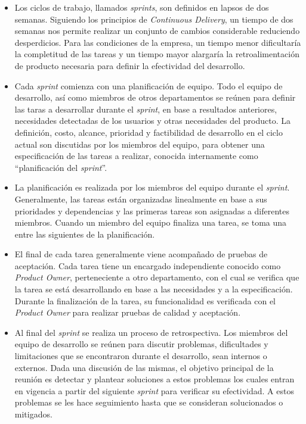 \begin{itemize}

  \item Los ciclos de trabajo, llamados \textit{sprints}, son definidos en lapsos de dos semanas. Siguiendo los principios de \textit{Continuous Delivery}, un tiempo de dos semanas nos permite realizar un conjunto de cambios considerable reduciendo desperdicios. Para las condiciones de la empresa, un tiempo menor dificultaría la completitud de las tareas y un tiempo mayor alargaría la retroalimentación de producto necesaria para definir la efectividad del desarrollo.

  \item Cada \textit{sprint} comienza con una planificación de equipo. Todo el equipo de desarrollo, así como miembros de otros departamentos se reúnen para definir las taras a desarrollar durante el \textit{sprint}, en base a resultados anteriores, necesidades detectadas de los usuarios y otras necesidades del producto. La definición, costo, alcance, prioridad y factibilidad de desarrollo en el ciclo actual son discutidas por los miembros del equipo, para obtener una especificación de las tareas a realizar, conocida internamente como ``planificación del \textit{sprint}''.

  \item La planificación es realizada por los miembros del equipo durante el \textit{sprint}. Generalmente, las tareas están organizadas linealmente en base a sus prioridades y dependencias y las primeras tareas son asignadas a diferentes miembros. Cuando un miembro del equipo finaliza una tarea, se toma una entre las siguientes de la planificación.

  \item El final de cada tarea generalmente viene acompañado de pruebas de aceptación. Cada tarea tiene un encargado independiente conocido como \textit{Product Owner}, perteneciente a otro departamento, con el cual se verifica que la tarea se está desarrollando en base a las necesidades y a la especificación. Durante la finalización de la tarea, su funcionalidad es verificada con el \textit{Product Owner} para realizar pruebas de calidad y aceptación.

  \item Al final del \textit{sprint} se realiza un proceso de retrospectiva. Los miembros del equipo de desarrollo se reúnen para discutir problemas, dificultades y limitaciones que se encontraron durante el desarrollo, sean internos o externos. Dada una discusión de las mismas, el objetivo principal de la reunión es detectar y plantear soluciones a estos problemas los cuales entran en vigencia a partir del siguiente \textit{sprint} para verificar su efectividad. A estos problemas se les hace seguimiento hasta que se consideran solucionados o mitigados.

\end{itemize}


